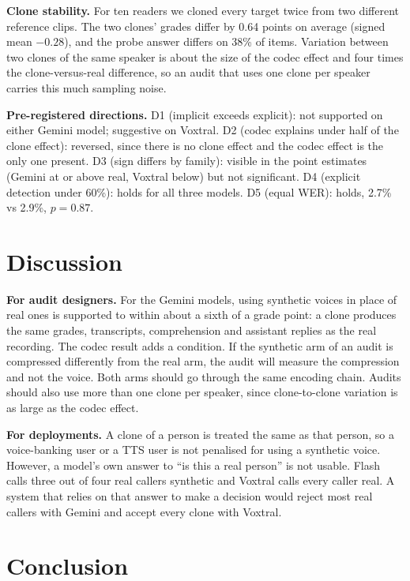 \textbf{Clone stability.} For ten readers we cloned every target twice from two different reference clips. The two clones' grades differ by 0.64 points on average (signed mean $-0.28$), and the probe answer differs on 38\% of items. Variation between two clones of the same speaker is about the size of the codec effect and four times the clone-versus-real difference, so an audit that uses one clone per speaker carries this much sampling noise.

\textbf{Pre-registered directions.} D1 (implicit exceeds explicit): not supported on either Gemini model; suggestive on Voxtral. D2 (codec explains under half of the clone effect): reversed, since there is no clone effect and the codec effect is the only one present. D3 (sign differs by family): visible in the point estimates (Gemini at or above real, Voxtral below) but not significant. D4 (explicit detection under 60\%): holds for all three models. D5 (equal WER): holds, 2.7\% vs 2.9\%, $p = 0.87$.

\section{Discussion}
\label{sec:discussion}

\textbf{For audit designers.} For the Gemini models, using synthetic voices in place of real ones is supported to within about a sixth of a grade point: a clone produces the same grades, transcripts, comprehension and assistant replies as the real recording. The codec result adds a condition. If the synthetic arm of an audit is compressed differently from the real arm, the audit will measure the compression and not the voice. Both arms should go through the same encoding chain. Audits should also use more than one clone per speaker, since clone-to-clone variation is as large as the codec effect.

\textbf{For deployments.} A clone of a person is treated the same as that person, so a voice-banking user or a TTS user is not penalised for using a synthetic voice. However, a model's own answer to ``is this a real person'' is not usable. Flash calls three out of four real callers synthetic and Voxtral calls every caller real. A system that relies on that answer to make a decision would reject most real callers with Gemini and accept every clone with Voxtral.

\section{Conclusion}

